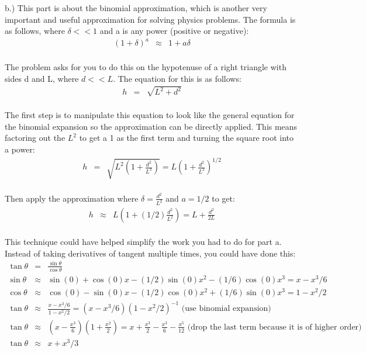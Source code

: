 \documentclass[11pt]{amsart}
\begin{document}
b.) This part is about the binomial approximation, which is another very important and useful approximation for solving physics problems. The formula is as follows, where $\delta<<1$ and a is any power (positive or negative): \\
\begin{eqnarray*}
(1+\delta)^{a} &\approx& 1 + a\delta 
\end{eqnarray*} \\
The problem asks for you to do this on the hypotenuse of a right triangle with sides d and L, where $d<<L$. The equation for this is as follows: \\
\begin{eqnarray*}
h &=& \sqrt{L^{2} + d^{2}} 
\end{eqnarray*}\\
The first step is to manipulate this equation to look like the general equation for the binomial expansion so the approximation can be directly applied. This means factoring out the $L^{2}$ to get a 1 as the first term and turning the square root into a power: \\  
\begin{eqnarray*} 
h &=& \sqrt{L^{2} \left(1 + \frac{d^{2}}{L^{2}} \right)} = L\left(1 + \frac{d^{2}}{L^{2}} \right)^{1/2} 
\end{eqnarray*} \\
Then apply the approximation where $\delta=\frac{d^{2}}{L^{2}}$ and $a=1/2$ to get: \\ 
\begin{eqnarray*}
h &\approx& L(1 + (1/2)\frac{d^{2}}{L^{2}}) = L + \frac{d^{2}}{2L} 
\end{eqnarray*}  \\
This technique could have helped simplify the work you had to do for part a. Instead of taking derivatives of tangent multiple times, you could have done this: \\ 
\begin{eqnarray*} 
\tan{\theta} &=& \frac{\sin{\theta}}{\cos{\theta}}  \\
\sin{\theta} &\approx& \sin(0) + \cos(0) x -(1/2)\sin(0) x^{2} - (1/6) \cos(0) x^{3} = x - x^{3}/6  \\
\cos{\theta} &\approx& \cos(0) - \sin(0) x -(1/2) \cos(0) x^{2} + (1/6) \sin(0)x^{3} = 1 - x^{2}/2
\\
\tan{\theta} &\approx& \frac{x - x^{3}/6}{1-x^{2}/2} = \left(x - x^{3}/6 \right)\left(1-x^{2}/2 \right)^{-1} \mbox{ (use binomial expansion)}  \\
\tan{\theta} &\approx& (x-\frac{x^{3}}{6})(1+\frac{x^{2}}{2}) = x+\frac{x^{3}}{2}-\frac{x^{3}}{6}-\frac{x^{5}}{12} \mbox{ (drop the last term because it is of higher order)}  \\
\tan{\theta} &\approx& x + x^{3}/3  
\end{eqnarray*} \\
\end{document}

